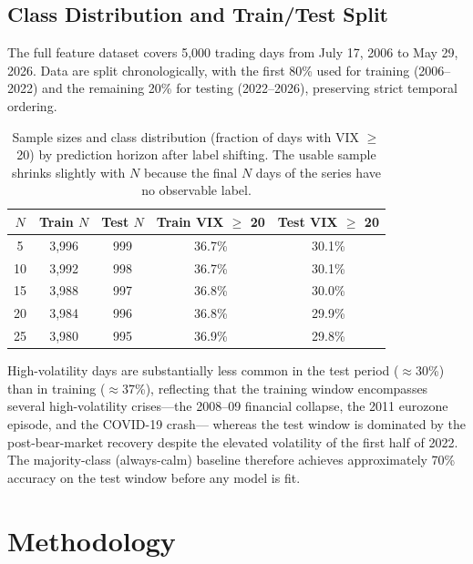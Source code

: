 \documentclass[12pt]{article}
\begin{document}
\subsection{Class Distribution and Train/Test Split}

The full feature dataset covers 5,000 trading days from July 17, 2006 to May 29, 2026. Data
are split chronologically, with the first 80\% used for training (2006--2022) and the remaining
20\% for testing (2022--2026), preserving strict temporal ordering.

\begin{table}[H]
\centering
\caption{Sample sizes and class distribution (fraction of days with VIX $\geq$ 20) by
prediction horizon after label shifting. The usable sample shrinks slightly with $N$ because
the final $N$ days of the series have no observable label.}
\label{tab:class}
\begin{tabular}{ccccc}
\toprule
$N$ & Train $N$ & Test $N$ & Train VIX $\geq$ 20 & Test VIX $\geq$ 20 \\
\midrule
5  & 3,996 & 999 & 36.7\% & 30.1\% \\
10 & 3,992 & 998 & 36.7\% & 30.1\% \\
15 & 3,988 & 997 & 36.8\% & 30.0\% \\
20 & 3,984 & 996 & 36.8\% & 29.9\% \\
25 & 3,980 & 995 & 36.9\% & 29.8\% \\
\bottomrule
\end{tabular}
\end{table}

High-volatility days are substantially less common in the test period ($\approx$30\%) than in
training ($\approx$37\%), reflecting that the training window encompasses several high-volatility
crises---the 2008--09 financial collapse, the 2011 eurozone episode, and the COVID-19 crash---
whereas the test window is dominated by the post-bear-market recovery despite the elevated
volatility of the first half of 2022. The majority-class (always-calm) baseline therefore
achieves approximately 70\% accuracy on the test window before any model is fit.

\section{Methodology}
\label{sec:methodology}
\end{document}
